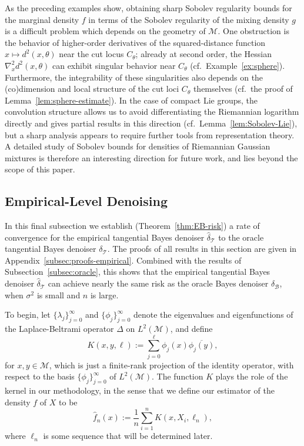 \documentclass[preprint]{imsart}
\theoremstyle{plain}
\theoremstyle{definition}
\newcommand{\Mcal}{\mathcal{M}}
\newcommand{\B}{\mathcal{B}}
\newcommand{\T}{\mathcal{T}}
\begin{document}
As the preceding examples show, obtaining sharp Sobolev regularity bounds for the marginal density $f$ in terms of the Sobolev regularity of the mixing density $g$ is a difficult problem which depends on the geometry of $\Mcal$.
One obstruction is the behavior of higher-order derivatives of the squared-distance function $x\mapsto d^2(x,\theta)$ near the cut locus $C_\theta$; already at second order, the Hessian $\nabla_x^2 d^2(x,\theta)$ can exhibit singular behavior near $C_\theta$ (cf.~Example~\ref{ex:sphere}).
Furthermore, the integrability of these singularities also depends on the (co)dimension and local structure of the cut loci $C_\theta$ themselves (cf.~the proof of Lemma~\ref{lem:sphere-estimate}).
In the case of compact Lie groups, the convolution structure allows us to avoid differentiating the Riemannian logarithm directly and gives partial results in this direction (cf.~Lemma~\ref{lem:Sobolev-Lie}), but a sharp analysis appears to require further tools from representation theory.
A detailed study of Sobolev bounds for densities of Riemannian Gaussian mixtures is therefore an interesting direction for future work, and lies beyond the scope of this paper.

\subsection{Empirical-Level Denoising}\label{subsec:empirical}

In this final subsection we establish (Theorem~\ref{thm:EB-risk}) a rate of convergence for the empirical tangential Bayes denoiser $\hat{\delta}_{\T}$ to the oracle tangential Bayes denoiser $\delta_{\T}$.
The proofs of all results in this section are given in Appendix~\ref{subsec:proofs-empirical}.
Combined with the results of Subsection~\ref{subsec:oracle}, this shows that the empirical tangential Bayes denoiser $\hat{\delta}_{\T}$ can achieve nearly the same risk as the oracle Bayes denoiser $\delta_{\B}$, when $\sigma^2$ is small and $n$ is large.

To begin, let $\{\lambda_j\}_{j=0}^{\infty}$ and $\{\phi_j\}_{j=0}^{\infty}$ denote the eigenvalues and eigenfunctions of the Laplace-Beltrami operator $\Delta$ on $L^2(\Mcal)$, and define
    \begin{equation*}
K(x,y,\ell):=\sum_{j=0}^{ \ell}\phi_j(x)\overline{\phi_j(y)},
    \end{equation*}
for $x,y \in \Mcal$, which is just a finite-rank projection of the identity operator, with respect to the basis $\{\phi_j\}_{j=0}^{\infty}$ of $L^2(\Mcal)$.
The function $K$ plays the role of the kernel in our methodology, in the sense that we define our estimator of the density $f$ of $X$ to be
\begin{equation}\label{eq:Density-Est}
        \hat f_n(x):=\frac{1}{n}\sum_{i=1}^{n}K(x,X_i,\ell_n),
    \end{equation}
    where $\ell_n$ is some sequence that will be determined later.
\end{document}
